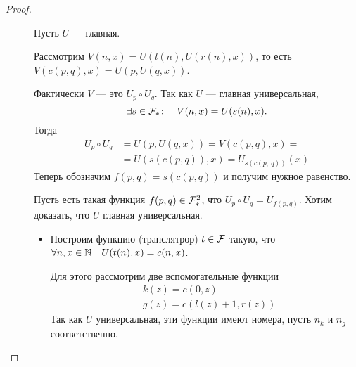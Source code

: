 \begin{proof}
    ~\begin{description}
		\item[] 
			Пусть $ U$ --- главная.

			Рассмотрим $ V(n, x) = U(l(n), U(r(n), x))$, то есть  $ V(c(p, q), x) = U(p, U(q, x))$. 

			Фактически $ V$ --- это $ U_p \circ U_q$.
			Так как $ U$ --- главная универсальная, 
			\[
				\exists s \in \mathcal{F}_{*} \colon \quad V(n, x) = U(s(n), x)
			.\] 
			Тогда
			\begin{align*}
				U_p \circ U_q &= U(p, U(q, x)) = V(c(p, q), x) = \\
							  &= U(s(c(p, q)), x) = U_{s(c(p,\: q))} (x) \tag{По определению транслятора}  
			\end{align*}
			Теперь обозначим $ f(p, q) = s(c(p, q))$ и получим нужное равенство.
		\item []
			\begin{proof*}
				Пусть есть такая функция $ f(p, q) \in \mathcal{F}^2_{*}$, что $ U_p \circ U_q = U_{f(p, q)}$. Хотим доказать, что $ U$ главная универсальная.
				\begin{itemize}
					\item Построим функцию (транслятрор) $ t \in \mathcal{F}$ такую, что $ \forall n, x \in \mathbb{N} \quad U(t(n), x) = c(n, x)$.

						Для этого рассмотрим две вспомогательные функции
						\begin{align*}
							& k(z) = c(0, z) \\
							& g(z) = c(l(z) + 1, r(z))
						\end{align*}
						Так как $ U$ универсальная, эти функции имеют номера, пусть $ n_k$ и  $ n_g$ соответственно.


\end{itemize}
\end{proof*}
\end{description}
\end{proof}
